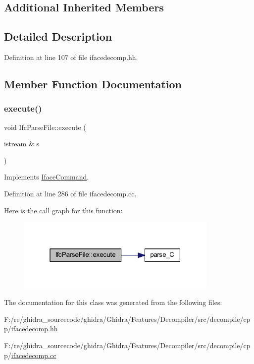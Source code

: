 \subsection*{Additional Inherited Members}


\subsection{Detailed Description}


Definition at line 107 of file ifacedecomp.\+hh.



\subsection{Member Function Documentation}
\mbox{\label{class_ifc_parse_file_abe050f74bc02c78b231ed636e629b3ca}} 
\subsubsection{\texorpdfstring{execute()}{execute()}}
{\footnotesize\ttfamily void Ifc\+Parse\+File\+::execute (\begin{DoxyParamCaption}\item[{istream \&}]{s }\end{DoxyParamCaption})\hspace{0.3cm}{\ttfamily [virtual]}}



Implements \mbox{\hyperlink{class_iface_command_af10e29cee2c8e419de6efe9e680ad201}{Iface\+Command}}.



Definition at line 286 of file ifacedecomp.\+cc.

Here is the call graph for this function\+:
\nopagebreak
\begin{figure}[H]
\begin{center}
\leavevmode
\includegraphics[width=277pt]{class_ifc_parse_file_abe050f74bc02c78b231ed636e629b3ca_cgraph}
\end{center}
\end{figure}


The documentation for this class was generated from the following files\+:\begin{DoxyCompactItemize}
\item 
F\+:/re/ghidra\+\_\+sourcecode/ghidra/\+Ghidra/\+Features/\+Decompiler/src/decompile/cpp/\mbox{\hyperlink{ifacedecomp_8hh}{ifacedecomp.\+hh}}\item 
F\+:/re/ghidra\+\_\+sourcecode/ghidra/\+Ghidra/\+Features/\+Decompiler/src/decompile/cpp/\mbox{\hyperlink{ifacedecomp_8cc}{ifacedecomp.\+cc}}\end{DoxyCompactItemize}
